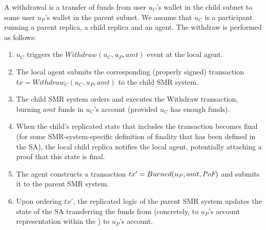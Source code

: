A withdrawal is a transfer of funds from user $u_C$'s wallet in the child subnet to some user $u_P$'s wallet in the parent subnet. We assume that $u_C$ is a participant running a parent replica, a child replica and an \nameAbbr agent. The withdraw is performed as follows:
\begin{enumerate}
  \item $u_C$ triggers the $Withdraw(u_C, u_P, amt)$ event at the local \nameAbbr agent.
    \item The local \nameAbbr agent submits the corresponding (properly signed) transaction $tx = Withdraw_C(u_C, u_P, amt)$ to the child SMR system.
    \item The child SMR system orders and executes the Withdraw transaction, burning $amt$ funds in $u_C$'s account (provided $u_C$ has enough funds).
    \item When the child's replicated state that includes the transaction becomes final (for some SMR-system-specific definition of finality that has been defined in the SA), the local child replica notifies the local \nameAbbr agent, potentially attaching a proof \prf that this state is final.%
    \item The \nameAbbr agent constructs a transaction $tx' = Burned(u_P, amt, \textit{PoF})$ and submits it to the parent SMR system.
    \item Upon ordering $tx'$, the replicated logic of the parent SMR system updates the state of the SA transferring the funds from \sa (concretely, to $u_P$'s account representation within the \sa) to $u_P$'s account.
\end{enumerate}

